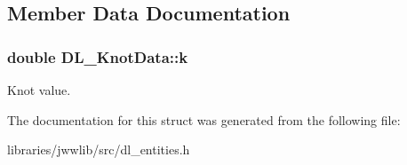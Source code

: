\subsection{Member Data Documentation}
\hypertarget{structDL__KnotData_aeb011dea5558de8e3a6138464970a1b0}{
\subsubsection[{k}]{\setlength{\rightskip}{0pt plus 5cm}double D\-L\-\_\-\-Knot\-Data\-::k}}\label{structDL__KnotData_aeb011dea5558de8e3a6138464970a1b0}
Knot value. 

The documentation for this struct was generated from the following file\-:\begin{DoxyCompactItemize}
\item 
libraries/jwwlib/src/dl\-\_\-entities.\-h\end{DoxyCompactItemize}
